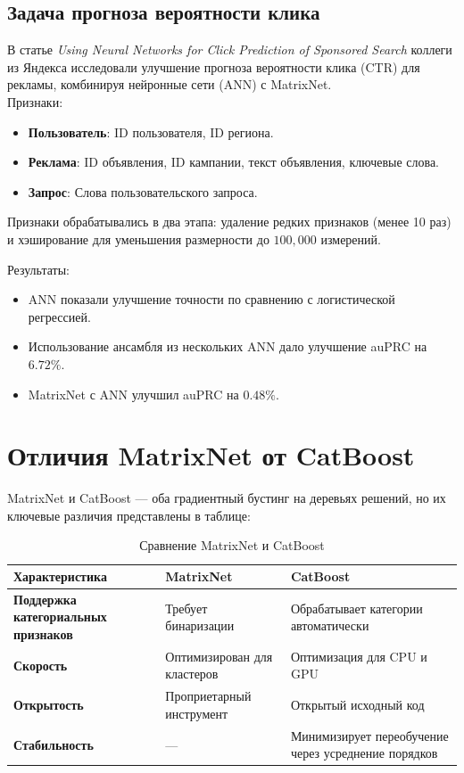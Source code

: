 \subsection{Задача прогноза вероятности клика}
В статье \emph{Using Neural Networks for Click Prediction of Sponsored Search} коллеги из Яндекса исследовали улучшение прогноза вероятности клика (CTR) для рекламы, комбинируя нейронные сети (ANN) с MatrixNet.\\

Признаки:
\begin{itemize}
    \item \textbf{Пользователь}: ID пользователя, ID региона.
    \item \textbf{Реклама}: ID объявления, ID кампании, текст объявления, ключевые слова.
    \item \textbf{Запрос}: Слова пользовательского запроса.
\end{itemize}
Признаки обрабатывались в два этапа: удаление редких признаков (менее 10 раз) и хэширование для уменьшения размерности до $100{,}000$ измерений.

Результаты:
\begin{itemize}
    \item ANN показали улучшение точности по сравнению с логистической регрессией.
    \item Использование ансамбля из нескольких ANN дало улучшение auPRC на $6.72\%$.
    \item MatrixNet с ANN улучшил auPRC на $0.48\%$.
\end{itemize}

\section{Отличия MatrixNet от CatBoost}
MatrixNet и CatBoost — оба градиентный бустинг на деревьях решений, но их ключевые различия представлены в таблице:\\

\begin{table}[h!]
\centering
\renewcommand{\arraystretch}{1.2}
\setlength{\tabcolsep}{8pt} 
\begin{tabular}{|p{3.5cm}|p{4.5cm}|p{4.5cm}|} 
\hline
\textbf{Характеристика} & \textbf{MatrixNet} & \textbf{CatBoost} \\ \hline
\textbf{Поддержка категориальных признаков} & Требует бинаризации & Обрабатывает категории автоматически \\ \hline
\textbf{Скорость} & Оптимизирован для кластеров & Оптимизация для CPU и GPU \\ \hline
\textbf{Открытость} & Проприетарный инструмент & Открытый исходный код \\ \hline
\textbf{Стабильность} & --- & Минимизирует переобучение через усреднение порядков \\ \hline
\end{tabular}
\caption{Сравнение MatrixNet и CatBoost}
\label{tab:matrixnet_vs_catboost}
\end{table}

